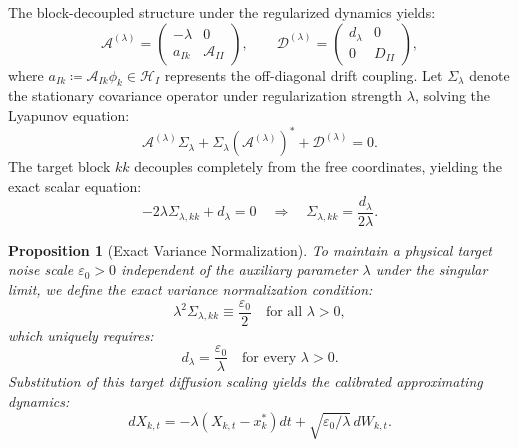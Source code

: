 \documentclass[11pt]{amsart}
\theoremstyle{plain}
\newtheorem{proposition}[theorem]{Proposition}
\theoremstyle{definition}
\theoremstyle{remark}
\begin{document}
    The block-decoupled structure under the regularized dynamics yields:
    \begin{equation}
        \mathcal{A}^{(\lambda)}=
    \begin{pmatrix}-\lambda&0\\a_{Ik}&\mathcal{A}_{II}\end{pmatrix},\qquad
        \mathcal{D}^{(\lambda)}=
    \begin{pmatrix}d_\lambda&0\\0&D_{II}\end{pmatrix},
    \end{equation}
    where $a_{Ik} \coloneqq \mathcal{A}_{Ik} \phi_k \in \mathcal{H}_I$ represents the off-diagonal drift coupling.
    Let $\Sigma_\lambda$ denote the stationary covariance operator under regularization strength $\lambda$, solving the Lyapunov equation:
    \begin{equation}
        \mathcal{A}^{(\lambda)}\Sigma_\lambda + \Sigma_\lambda(\mathcal{A}^{(\lambda)})^* + \mathcal{D}^{(\lambda)} = 0.
    \end{equation}
    The target block $kk$ decouples completely from the free coordinates, yielding the exact scalar equation:
    \begin{equation}
        -2\lambda\Sigma_{\lambda,kk} + d_\lambda = 0 \quad \Longrightarrow \quad \Sigma_{\lambda,kk} = \frac{d_\lambda}{2\lambda}.
    \end{equation}

    \begin{proposition}[Exact Variance Normalization]
        \label{prop:exact_calibration}
        To maintain a physical target noise scale $\varepsilon_0 > 0$ independent of the auxiliary parameter $\lambda$ under the singular limit, we define the exact variance normalization condition:
        \begin{equation}
            \lambda^2 \Sigma_{\lambda,kk} \equiv \frac{\varepsilon_0}{2} \quad \text{for all } \lambda > 0,
        \end{equation}
        which uniquely requires:
        \begin{equation}
            d_\lambda = \frac{\varepsilon_0}{\lambda} \quad \text{for every } \lambda > 0.
        \end{equation}
        Substitution of this target diffusion scaling yields the calibrated approximating dynamics:
        \begin{equation}
            dX_{k,t} = -\lambda (X_{k,t} - x_k^*) dt + \sqrt{\varepsilon_0 / \lambda}\, dW_{k,t}.
        \end{equation}
    \end{proposition}
\end{document}
